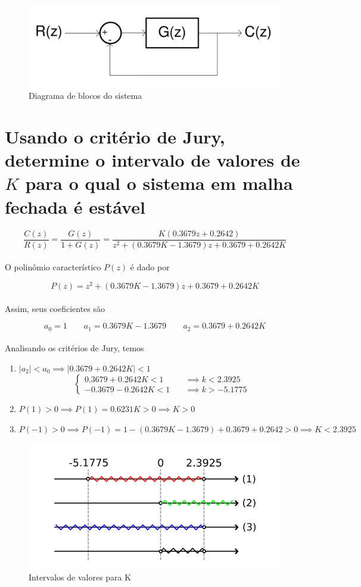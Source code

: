 \documentclass{article}
\begin{document}
\begin{figure}[H]
    \centering
        \includegraphics[width=.6\linewidth]{images/block_diagram.png}
        \caption{Diagrama de blocos do sistema}\label{fig:block}
\end{figure}

\section{Usando o critério de Jury, determine o intervalo de valores de $K$
    para o qual o sistema em malha fechada é estável
}

    \[ \frac{C(z)}{R(z)} = \frac{G(z)}{1 + G(z)} = \frac{K(0.3679z + 0.2642)}{z^2 + (0.3679K - 1.3679)z + 0.3679 + 0.2642K} \]\\

    {O polinômio característico $P(z)$ é dado por}

    \[ P(z) = z^2 + (0.3679K - 1.3679)z + 0.3679 + 0.2642K \]\\

    {Assim, seus coeficientes são}

    \[ a_0 = 1\qquad  a_1 = 0.3679K - 1.3679\qquad a_2 = 0.3679 + 0.2642K \]\\

    {Analisando os critérios de Jury, temos}

    \begin{enumerate}
        \item $ |a_2| < a_0 \implies |0.3679 + 0.2642K| < 1 $
            \[
                \begin{cases}
                    0.3679 + 0.2642K < 1  & \quad \implies k < 2.3925\\
                    -0.3679 - 0.2642K < 1 & \quad \implies k > -5.1775
                \end{cases}
            \]
        \item $ P(1)  > 0 \implies P(1)  = 0.6231K > 0 \implies K > 0 $
        \item $ P(-1) > 0 \implies P(-1) = 1 - (0.3679K - 1.3679) + 0.3679 + 0.2642 > 0 \implies K < 2.3925 $
    \end{enumerate}

    \begin{figure}[H]
        \centering
            \includegraphics[width=.5\linewidth]{images/k_intervals.png}
            \caption{Intervalos de valores para K}\label{fig:intervals}
    \end{figure}
\end{document}
